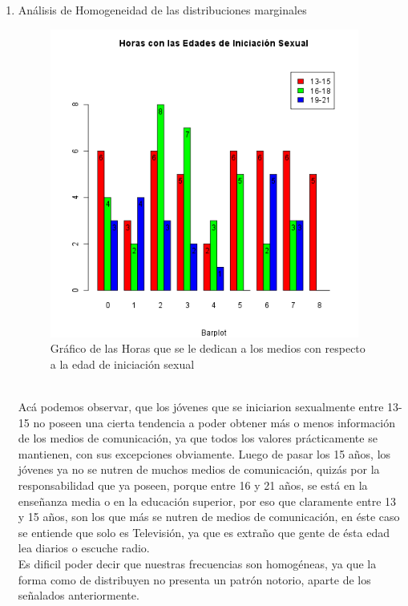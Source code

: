 \documentclass[letterpaper,spanish,11pt]{article}
\begin{document}
\begin{itemize}
\begin{enumerate}
\item An\'alisis de Homogeneidad de las distribuciones marginales\\
      \begin{figure}[htbp]
      	  \centering
  	  \includegraphics[width=4in,height=4in]{barplot_hor3}
	  \caption{Gr\'afico de las Horas que se le dedican a los medios con respecto a la edad de iniciaci\'on sexual}
	  \label{fig:histograma1}
      \end{figure}\\
	Ac\'a podemos observar, que los j\'ovenes que se iniciarion sexualmente entre 13-15 no poseen una cierta tendencia
	a poder obtener m\'as o menos informaci\'on de los medios de comunicaci\'on, ya que todos los valores pr\'acticamente
	se mantienen, con sus excepciones obviamente. Luego de pasar los 15 a\~nos, los j\'ovenes ya no se nutren de muchos
	medios de comunicaci\'on, quiz\'as por la responsabilidad que ya poseen, porque entre 16 y 21 a\~nos, se est\'a en la
	ense\~nanza media o en la educaci\'on superior, por eso que claramente entre 13 y 15 a\~nos, son los que m\'as se nutren
	de medios de comunicaci\'on, en \'este caso se entiende que solo es Televisi\'on, ya que es extra\~no que gente de \'esta
	edad lea diarios o escuche radio.\\
	Es dificil poder decir que nuestras frecuencias son homog\'eneas, ya que la forma como de distribuyen no presenta
	un patr\'on notorio, aparte de los se\~nalados anteriormente. 


\end{enumerate}
\end{itemize}
\end{document}

